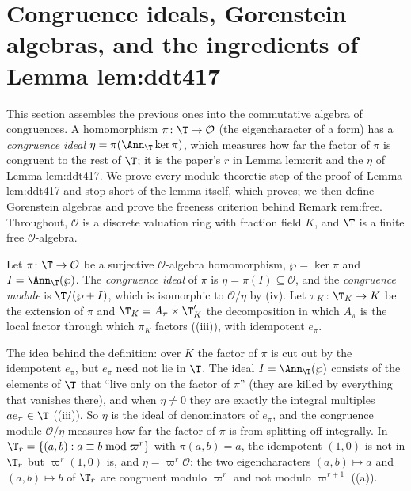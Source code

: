 \section[Congruence ideals and Gorenstein algebras]{Congruence ideals, Gorenstein algebras, and the ingredients of Lemma lem:ddt417}\label{sec:modules:congruence}

This section assembles the previous ones into the commutative algebra of congruences. A homomorphism $\pi\colon\T\to\mathcal O$ (the eigencharacter of a
form) has a \emph{congruence ideal} $\eta=\pi(\Ann_\T\ker\pi)$, which measures how far the factor of $\pi$ is congruent to the rest of $\T$; it is the paper's
$r$ in Lemma lem:crit and the $\eta$ of Lemma lem:ddt417. We prove every module-theoretic step of the proof of Lemma lem:ddt417 and stop short of the
lemma itself, which  proves; we then define Gorenstein algebras and prove the freeness criterion behind Remark rem:free. Throughout,
$\mathcal O$ is a discrete valuation ring with fraction field $K$, and $\T$ is a finite free $\mathcal O$-algebra.

\begin{definition}\label{def:modules:congruence-ideal}
Let $\pi\colon\T\to\mathcal O$ be a surjective $\mathcal O$-algebra homomorphism, $\wp=\ker\pi$ and $I=\Ann_\T(\wp)$. The \emph{congruence ideal} of $\pi$ is $\eta=\pi(I)\subseteq\mathcal O$,
and the \emph{congruence module} is $\T/(\wp+I)$, which is isomorphic to $\mathcal O/\eta$ by (iv). Let $\pi_K\colon\T_K\to K$ be the extension
of $\pi$ and $\T_K=A_\pi\times\T'_K$ the decomposition in which $A_\pi$ is the local factor through which $\pi_K$ factors ((iii)),
with idempotent $e_\pi$.
\end{definition}

The idea behind the definition: over $K$ the factor of $\pi$ is cut out by the idempotent $e_\pi$, but $e_\pi$ need not lie in $\T$. The ideal
$I=\Ann_\T(\wp)$ consists of the elements of $\T$ that ``live only on the factor of $\pi$'' (they are killed by everything that vanishes there), and
when $\eta\ne0$ they are exactly the integral multiples $ae_\pi\in\T$ ((iii)). So $\eta$ is the ideal of
denominators of $e_\pi$, and the congruence module $\mathcal O/\eta$ measures how far the factor of $\pi$ is from splitting off integrally. In
$\T_r=\{(a,b):a\equiv b\bmod\varpi^r\}$ with $\pi(a,b)=a$, the idempotent $(1,0)$ is not in $\T_r$ but $\varpi^r(1,0)$ is, and $\eta=\varpi^r\mathcal O$:
the two eigencharacters $(a,b)\mapsto a$ and $(a,b)\mapsto b$ of $\T_r$ are congruent modulo $\varpi^r$ and not modulo $\varpi^{r+1}$
((a)).

